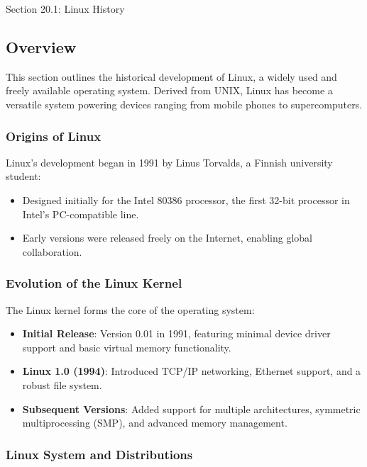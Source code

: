 \begin{notes}{Section 20.1: Linux History}
    \subsection*{Overview}

    This section outlines the historical development of Linux, a widely used and freely available operating system. Derived from UNIX, Linux has become a versatile system powering devices ranging 
    from mobile phones to supercomputers.
    
    \subsubsection*{Origins of Linux}
    
    Linux's development began in 1991 by Linus Torvalds, a Finnish university student:
    \begin{itemize}
        \item Designed initially for the Intel 80386 processor, the first 32-bit processor in Intel's PC-compatible line.
        \item Early versions were released freely on the Internet, enabling global collaboration.
    \end{itemize}
    
    \subsubsection*{Evolution of the Linux Kernel}
    
    The Linux kernel forms the core of the operating system:
    \begin{itemize}
        \item \textbf{Initial Release}: Version 0.01 in 1991, featuring minimal device driver support and basic virtual memory functionality.
        \item \textbf{Linux 1.0 (1994)}: Introduced TCP/IP networking, Ethernet support, and a robust file system.
        \item \textbf{Subsequent Versions}: Added support for multiple architectures, symmetric multiprocessing (SMP), and advanced memory management.
    \end{itemize}
    
    \subsubsection*{Linux System and Distributions}
    

\end{notes}
